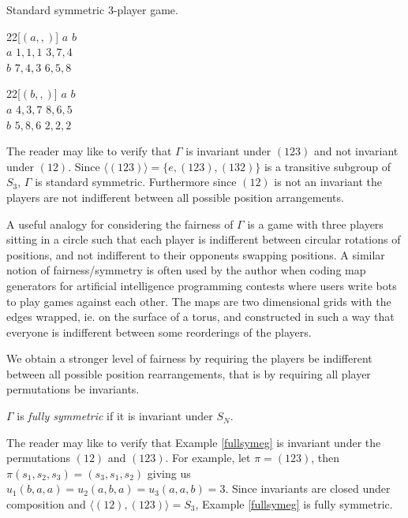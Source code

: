 	\begin{example} \label{stdsymeg} Standard symmetric 3-player game.
		\begin{center}
  		\begin{game}{2}{2}[$(a,,)$]
				\>  $a$      \>  $b$      \\
			$a$	\>  $1,1,1$  \>  $3,7,4$  \\
			$b$	\>  $7,4,3$  \>  $6,5,8$  
		\end{game}
		\hspace*{5mm}
		\begin{game}{2}{2}[$(b,,)$]
				\>  $a$      \>  $b$      \\
			$a$	\>  $4,3,7$  \>  $8,6,5$  \\
   			$b$	\>  $5,8,6$  \>  $2,2,2$  
		\end{game}
		\end{center}
		
		The reader may like to verify that $\Gamma$ is invariant under $(123)$ and not invariant under $(12)$. Since $\langle (123)\rangle = \{e, (123), (132)\}$ is a transitive subgroup of $S_3$, $\Gamma$ is standard symmetric. Furthermore since $(12)$ is not an invariant the players are not indifferent between all possible position arrangements.
		
		A useful analogy for considering the fairness of $\Gamma$ is a game with three players sitting in a circle such that each player is indifferent between circular rotations of positions, and not indifferent to their opponents swapping positions. A similar notion of fairness/symmetry is often used by the author when coding map generators for artificial intelligence programming contests where users write bots to play games against each other. The maps are two dimensional grids with the edges wrapped, ie. on the surface of a torus, and constructed in such a way that everyone is indifferent between some reorderings of the players.
	\end{example}
	
	We obtain a stronger level of fairness by requiring the players be indifferent between all possible position rearrangements, that is by requiring all player permutations be invariants.

\begin{definition} \label{fullsymdef}
	$\Gamma$ is \textit{fully symmetric} if it is invariant under $S_N$.
\end{definition}

The reader may like to verify that Example \ref{fullsymeg} is invariant under the permutations $(12)$ and $(123)$. For example, let $\pi = (123)$, then $\pi(s_1, s_2, s_3) = (s_3, s_1, s_2)$ giving us $u_1(b, a, a) = u_2(a, b, a) = u_3(a, a, b) = 3$. Since invariants are closed under composition and $\langle (12), (123)\rangle = S_3$, Example \ref{fullsymeg} is fully symmetric. 

